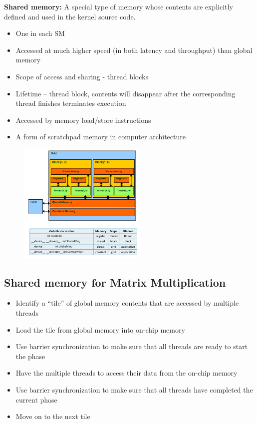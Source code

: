 \textbf{Shared memory:} A special type of memory whose contents are explicitly defined and used in the kernel source code.

\begin{itemize}
	\item One in each SM
	\item Accessed at much higher speed (in both latency and throughput) than global memory
	\item Scope of access and sharing - thread blocks
	\item Lifetime – thread block, contents will disappear after the corresponding thread finishes terminates execution 
	\item Accessed by memory load/store instructions
	\item A form of scratchpad memory in computer architecture
\end{itemize}


\begin{figure}[ht]
	\centering
	\includegraphics[width=0.55\textwidth]{figure_parallel/shared_memory_1.png}
\end{figure}
\FloatBarrier

\subsection{Shared memory for Matrix Multiplication}

\begin{itemize}
	\item Identify a “tile” of global memory contents that are accessed by multiple threads
	\item Load the tile from global memory into on-chip memory
	\item Use barrier synchronization to make sure that all threads are ready to start the phase
	\item Have the multiple threads to access their data from the on-chip memory
	\item Use barrier synchronization to make sure that all threads have completed the current phase
	\item Move on to the next tile
\end{itemize}

